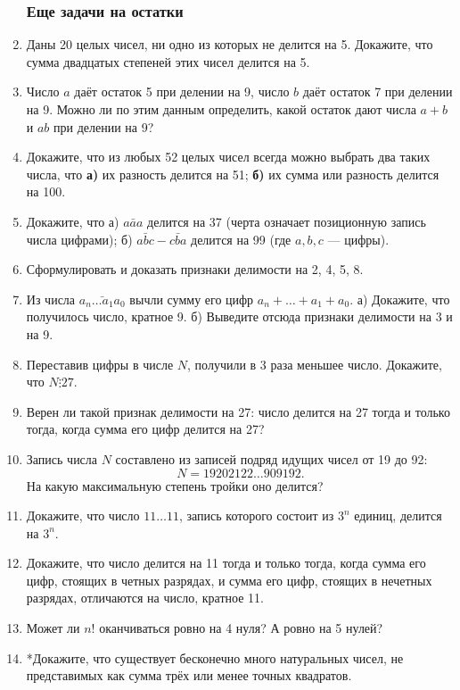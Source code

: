 \begin{enumerate}
\subsubsection*{Еще задачи на остатки}
\item Даны 20 целых чисел, ни одно из которых не делится на 5. Докажите, что сумма двадцатых
степеней этих чисел делится на 5.
\item Число $a$ даёт остаток 5 при делении на 9, число $b$ даёт остаток
7 при делении на 9. Можно ли по этим данным определить, какой
остаток дают числа $a + b$ и $ab$ при делении на 9?
\item Докажите, что из любых 52 целых чисел всегда можно выбрать два таких числа, что
\textbf{а)} их разность делится на 51; \textbf{б)} их сумма или разность делится на 100.
\item Докажите, что а) $\bar{aaa}$ делится на 37 (черта означает позиционную запись числа цифрами); б) $\bar{abc}-\bar{cba}$ делится на 99 (где $a,b,c$ --- цифры).
\item Сформулировать и доказать признаки делимости на 2, 4, 5, 8.
\item Из числа $\bar{a_n\dots a_1a_0}$ вычли сумму его цифр $a_n+\dots+a_1+a_0$. а) Докажите, что получилось число, кратное 9. б) Выведите отсюда признаки делимости на 3 и на 9.
\item Переставив цифры в числе $N$, получили в 3 раза меньшее число. Докажите, что $N\vdots 27$.
\item Верен ли такой признак делимости на 27: число делится на 27
тогда и только тогда, когда сумма его цифр делится на 27?
\item Запись числа $N$ составлено из записей подряд идущих чисел от 19 до 92:
$$
N=19202122\dots 909192.
$$
На какую максимальную степень тройки оно делится?
\item Докажите, что число $11\dots 11$, запись которого состоит из $3^n$ единиц, делится на $3^n$.
\item Докажите, что число делится на 11 тогда и только тогда, когда сумма его цифр, стоящих в четных разрядах, и сумма его цифр, стоящих в нечетных разрядах, отличаются на число, кратное 11.
\item Может ли $n!$ оканчиваться ровно на 4 нуля? А ровно на 5 нулей?
\item *Докажите, что существует бесконечно много натуральных чисел, не представимых как сумма трёх или менее точных квадратов.
\end{enumerate}







